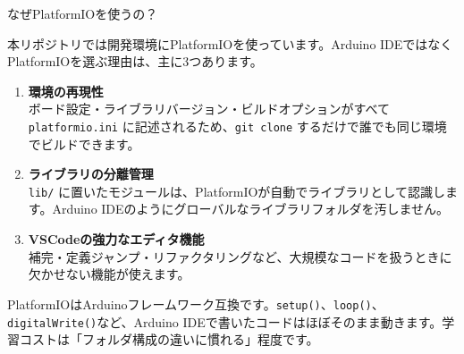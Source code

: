 \begin{qabox}{なぜPlatformIOを使うの？}

本リポジトリでは開発環境にPlatformIOを使っています。Arduino IDEではなくPlatformIOを選ぶ理由は、主に3つあります。

\begin{enumerate}
  \item \textbf{環境の再現性} \\
        ボード設定・ライブラリバージョン・ビルドオプションがすべて \texttt{platformio.ini} に記述されるため、\texttt{git clone} するだけで誰でも同じ環境でビルドできます。

  \item \textbf{ライブラリの分離管理} \\
        \texttt{lib/} に置いたモジュールは、PlatformIOが自動でライブラリとして認識します。Arduino IDEのようにグローバルなライブラリフォルダを汚しません。

  \item \textbf{VSCodeの強力なエディタ機能} \\
        補完・定義ジャンプ・リファクタリングなど、大規模なコードを扱うときに欠かせない機能が使えます。
\end{enumerate}

\begin{notebox}
PlatformIOはArduinoフレームワーク互換です。\texttt{setup()}、\texttt{loop()}、\texttt{digitalWrite()}など、Arduino IDEで書いたコードはほぼそのまま動きます。学習コストは「フォルダ構成の違いに慣れる」程度です。
\end{notebox}

\end{qabox}

